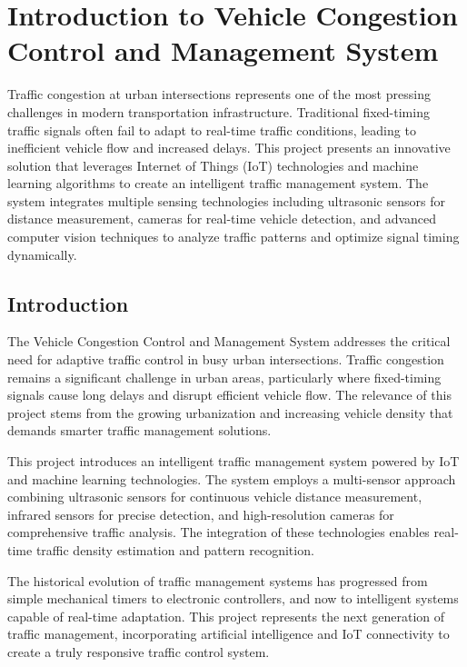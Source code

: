 \chapter{Introduction to Vehicle Congestion Control and Management System}
Traffic congestion at urban intersections represents one of the most pressing challenges in modern transportation infrastructure. Traditional fixed-timing traffic signals often fail to adapt to real-time traffic conditions, leading to inefficient vehicle flow and increased delays. This project presents an innovative solution that leverages Internet of Things (IoT) technologies and machine learning algorithms to create an intelligent traffic management system. The system integrates multiple sensing technologies including ultrasonic sensors for distance measurement, cameras for real-time vehicle detection, and advanced computer vision techniques to analyze traffic patterns and optimize signal timing dynamically.

\section[Introduction]{\textbf{Introduction}}

The Vehicle Congestion Control and Management System addresses the critical need for adaptive traffic control in busy urban intersections. Traffic congestion remains a significant challenge in urban areas, particularly where fixed-timing signals cause long delays and disrupt efficient vehicle flow. The relevance of this project stems from the growing urbanization and increasing vehicle density that demands smarter traffic management solutions.

This project introduces an intelligent traffic management system powered by IoT and machine learning technologies. The system employs a multi-sensor approach combining ultrasonic sensors for continuous vehicle distance measurement, infrared sensors for precise detection, and high-resolution cameras for comprehensive traffic analysis. The integration of these technologies enables real-time traffic density estimation and pattern recognition.

The historical evolution of traffic management systems has progressed from simple mechanical timers to electronic controllers, and now to intelligent systems capable of real-time adaptation. This project represents the next generation of traffic management, incorporating artificial intelligence and IoT connectivity to create a truly responsive traffic control system.

